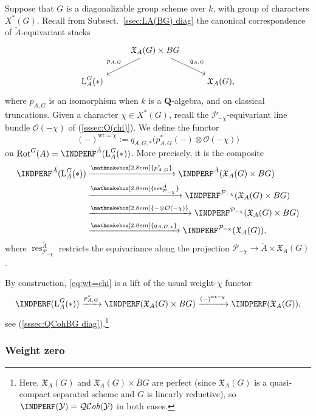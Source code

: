 \documentclass[12pt, oneside]{amsart}
\numberwithin{equation}{section}
\theoremstyle{remark}
\theoremstyle{plain}
\DeclareMathOperator{\QCOH}{\mathcal{QC}\textit{oh}}
\newcommand{\frX}{\mathfrak{X}}
\newcommand{\Loop}{\operatorname{L}}
\newcommand{\OO}{\mathcal{O}}
\newcommand{\YY}{\mathcal{Y}}
\newcommand{\bQ}{\mathbf{Q}}
\newcommand{\Rot}{\operatorname{Rot}}
\begin{document}
Suppose that $G$ is a diagonalizable group scheme over $k$, with group of characters $X^*(G)$.
Recall from Subsect.~\ref{ssec:LA(BG) diag} the canonical correspondence of $\check{A}$-equivariant stacks
\[
  \begin{tikzcd}
    & \frX_A(G) \times BG \ar[swap]{ld}{p_{A,G}}\ar{rd}{q_{A,G}} &
    \\
    \Loop_A^G(*) & & \frX_A(G),
  \end{tikzcd}
\]
where $p_{A,G}$ is an isomorphism when $k$ is a $\bQ$-algebra, and on classical truncations.
Given a character $\chi \in X^*(G)$, recall the $\mathcal{P}_{-\chi}$-equivariant line bundle $\OO(-\chi)$ of (\ref{sssec:O(chi)}).
We define the functor
\begin{equation}\label{eq:wt=chi}
  (-)^{\mathrm{wt}=\chi} :=
  q_{A,G,*} \bigl( p_{A,G}^*(-) \otimes \OO(-\chi) \bigr)
\end{equation}
on $\Rot^G(A) = \INDPERF^{\check{A}}(\Loop_A^G(*))$.
More precisely, it is the composite
\begin{equation*}
  \begin{aligned}
    \INDPERF^{\check{A}}(\Loop_A^G(*))
    &\xrightarrow{\mathmakebox[2.8em]{p_{A,G}^*}}
    \INDPERF^{\check{A}}(\frX_A(G) \times BG)
    \\
    &\xrightarrow{\mathmakebox[2.8em]{\operatorname{res}^{\check{A}}_{\mathcal{P}_{-\chi}}}}
    \INDPERF^{\mathcal{P}_{-\chi}}(\frX_A(G) \times BG)
    \\
    &\xrightarrow{\mathmakebox[2.8em]{- \otimes \OO(-\chi)}}
    \INDPERF^{\mathcal{P}_{-\chi}}(\frX_A(G) \times BG)
    \\
    &\xrightarrow{\mathmakebox[2.8em]{q_{A,G,*}}}
    \INDPERF^{\mathcal{P}_{-\chi}}(\frX_A(G)),
  \end{aligned}
\end{equation*}
where $\operatorname{res}^{\check{A}}_{\mathcal{P}_{-\chi}}$ restricts the equivariance along the projection $\mathcal{P}_{-\chi} \to \check{A} \times \frX_A(G)$.

By construction, \eqref{eq:wt=chi} is a lift of the usual weight-$\chi$ functor
\[
  \INDPERF(\Loop_A^G(*)) \xrightarrow{p_{A,G}^*}
  \INDPERF(\frX_A(G) \times BG) \xrightarrow{(-)^{\mathrm{wt}=\chi}}
	\INDPERF(\frX_A(G)),
\]
see (\ref{sssec:QCohBG diag}).\footnote{%
  Here, $\frX_A(G)$ and $\frX_A(G) \times BG$ are perfect (since $\frX_A(G)$ is a quasi-compact separated scheme and $G$ is linearly reductive), so $\INDPERF(\YY) = \QCOH(\YY)$ in both cases.
}

\subsubsection{Weight zero} \label{sssec:Shv wt=0}
\end{document}
